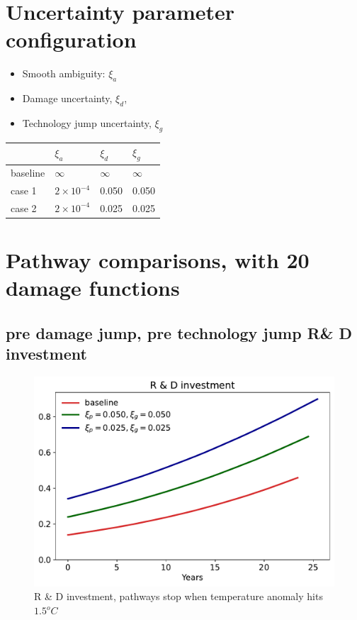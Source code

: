 \documentclass[12pt]{article}
\begin{document}
	\section{Uncertainty parameter configuration}
	\begin{itemize}
		\item Smooth ambiguity: $\xi_a$
		\item Damage uncertainty, $\xi_d$,
		\item Technology jump uncertainty, $\xi_g$
	\end{itemize}
	
	\begin{table}[H]
		\centering
		\begin{tabular}{llll}
			\toprule
			& $\xi_a$ & $\xi_d$ & $\xi_g$ \\
			\midrule
			baseline & $\infty$ & $\infty$ & $\infty$\\
			case 1 & $2 \times 10^{-4}$ & 0.050 & 0.050 \\
			case 2 & $2 \times 10^{-4}$ & 0.025& 0.025\\
			\bottomrule
		\end{tabular}
	\end{table}

\section{Pathway comparisons, with 20 damage functions}

\subsection{pre damage jump, pre technology jump R\& D investment}
\begin{figure}[H]
	\centering
	\includegraphics[width=\textwidth]{../figures/xi_comparison/20damage/Xt_1p5.pdf}
	\caption{R \& D investment, pathways stop when temperature anomaly hits $1.5^o C$}
\end{figure}
\end{document}
